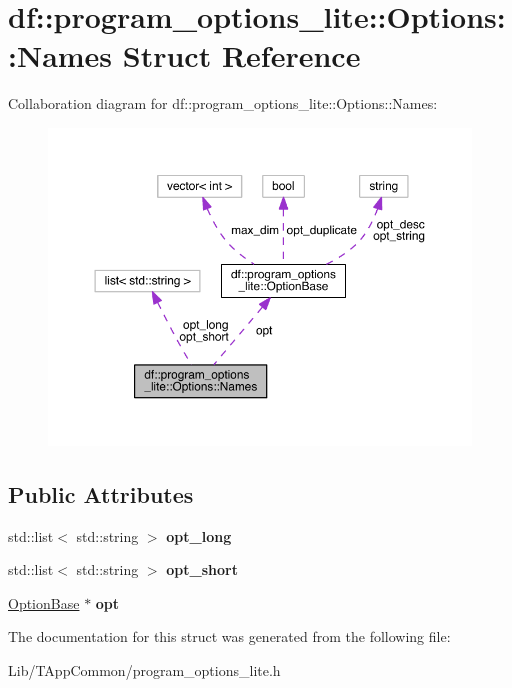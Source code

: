 \hypertarget{structdf_1_1program__options__lite_1_1_options_1_1_names}{}\section{df\+:\+:program\+\_\+options\+\_\+lite\+:\+:Options\+:\+:Names Struct Reference}
\label{structdf_1_1program__options__lite_1_1_options_1_1_names}


Collaboration diagram for df\+:\+:program\+\_\+options\+\_\+lite\+:\+:Options\+:\+:Names\+:
\nopagebreak
\begin{figure}[H]
\begin{center}
\leavevmode
\includegraphics[width=350pt]{d5/d00/structdf_1_1program__options__lite_1_1_options_1_1_names__coll__graph}
\end{center}
\end{figure}
\subsection*{Public Attributes}
\begin{DoxyCompactItemize}
\item 
\mbox{\label{structdf_1_1program__options__lite_1_1_options_1_1_names_a21cc23896ea246d515ca3864b8ccc672}} 
std\+::list$<$ std\+::string $>$ {\bfseries opt\+\_\+long}
\item 
\mbox{\label{structdf_1_1program__options__lite_1_1_options_1_1_names_a8962e18d10f3b0c52a4a69a1849f1d27}} 
std\+::list$<$ std\+::string $>$ {\bfseries opt\+\_\+short}
\item 
\mbox{\label{structdf_1_1program__options__lite_1_1_options_1_1_names_ad69087ab3e33f09961ce3b2fc4e7ea4a}} 
\hyperlink{structdf_1_1program__options__lite_1_1_option_base}{Option\+Base} $\ast$ {\bfseries opt}
\end{DoxyCompactItemize}


The documentation for this struct was generated from the following file\+:\begin{DoxyCompactItemize}
\item 
Lib/\+T\+App\+Common/program\+\_\+options\+\_\+lite.\+h\end{DoxyCompactItemize}
